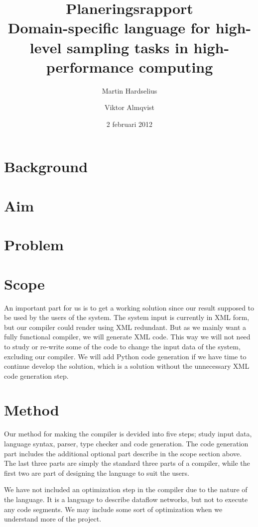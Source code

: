 \documentclass[a4paper]{article}
\title{\textbf{{\huge Planeringsrapport}}\\Domain-specific language for high-level sampling tasks in high-performance computing}
\author{Martin Hardselius
  \and Viktor Almqvist}
\date{2 februari 2012}
\begin{document}
\maketitle
\newpage

\section{Background}

\section{Aim}

\section{Problem}

\section{Scope}

An important part for us is to get a working solution since our result
supposed to be used by the users of the system. The system input is
currently in XML form, but our compiler could render using XML
redundant. But as we mainly want a fully functional compiler, we will
generate XML code. This way we will not need to study or re-write some
of the code to change the input data of the system, excluding our
compiler. We will add Python code generation if we have time to
continue develop the solution, which is a solution without the
unnecessary XML code generation step.



\section{Method}
Our method for making the compiler is devided into five steps; study
input data, language syntax, parser, type checker and code
generation. The code generation part includes the additional optional
part describe in the scope section above. The last three parts are
simply the standard three parts of a compiler, while the first two are
part of designing the language to suit the users.

We have not included an optimization step in the compiler due to the
nature of the language. It is a language to describe dataflow
networks, but not to execute any code segments. We may include some
sort of optimization when we understand more of the project.
\end{document}
